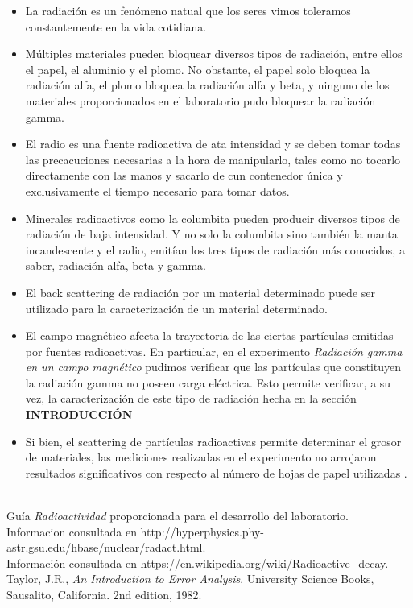 \documentclass[prb,aps,twocolumn,preprintnumbers,amsmath,amssymb]{revtex4}
\begin{document}
\begin{itemize}
	\item La radiación es un fenómeno natual que los seres vimos toleramos constantemente en la vida cotidiana.
	
	\item Múltiples materiales pueden bloquear diversos tipos de radiación, entre ellos el papel, el aluminio y el plomo. No obstante, el papel solo bloquea la radiación alfa, el plomo bloquea la radiación alfa y beta, y ninguno de los materiales proporcionados en el laboratorio pudo bloquear la radiación gamma.
	
	\item El radio es una fuente radioactiva de ata intensidad y se deben tomar todas las precacuciones necesarias a la hora de manipularlo, tales como no tocarlo directamente con las manos y sacarlo de cun contenedor única y exclusivamente el tiempo necesario para tomar datos.
	
	\item Minerales radioactivos como la columbita pueden producir diversos tipos de radiación de baja intensidad. Y no solo la columbita sino también la manta incandescente y el radio, emitían los tres tipos de radiación más conocidos, a saber, radiación alfa, beta y gamma.
	
	\item El back scattering de radiación por un material determinado puede ser utilizado para la caracterización de un material determinado.
	
	\item El campo magnético afecta la trayectoria de las ciertas partículas emitidas por fuentes radioactivas. En particular, en el experimento \textit{Radiación gamma en un campo magnético} pudimos verificar que las partículas que constituyen la radiación gamma no poseen carga eléctrica. Esto permite verificar, a su vez, la caracterización de este tipo de radiación hecha en la sección  \textbf{INTRODUCCIÓN} 
	
	\item Si bien, el scattering de partículas radioactivas permite determinar el grosor de materiales, las mediciones realizadas en el experimento no arrojaron resultados significativos con respecto al número de hojas de papel utilizadas .
\end{itemize}

\begin{thebibliography}{99}
\
\\
 Guía \textit{Radioactividad} proporcionada para el desarrollo del laboratorio.\\
\bibitem{hyperphyisics} Informacion consultada en http://hyperphysics.phy-astr.gsu.edu/hbase/nuclear/radact.html.\\
\bibitem{wikipedia} Información consultada en https://en.wikipedia.org/wiki/Radioactive\_decay.\\
\bibitem{error} Taylor, J.R., \textit{An Introduction to Error Analysis}. University Science Books, Sausalito, California. 2nd edition, 1982.\\
\end{thebibliography}
\end{document}
